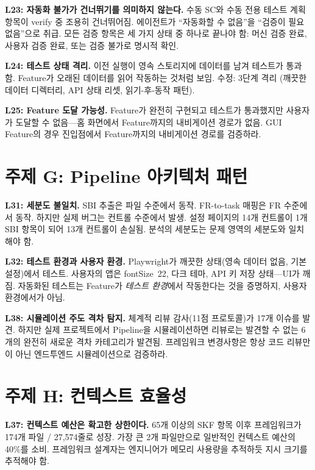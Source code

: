 \documentclass[11pt,a4paper,openright,twoside]{report}
\begin{document}
\textbf{L23: 자동화 불가가 건너뛰기를 의미하지 않는다.} 수동 SC와 수동 전용 테스트 계획 항목이 verify 중 조용히 건너뛰어짐. 에이전트가 ``자동화할 수 없음''을 ``검증이 필요 없음''으로 취급. 모든 검증 항목은 세 가지 상태 중 하나로 끝나야 함: 머신 검증 완료, 사용자 검증 완료, 또는 검증 불가로 명시적 확인.

\textbf{L24: 테스트 상태 격리.} 이전 실행이 영속 스토리지에 데이터를 남겨 테스트가 통과함. Feature가 오래된 데이터를 읽어 작동하는 것처럼 보임. 수정: 3단계 격리 (깨끗한 데이터 디렉터리, API 상태 리셋, 읽기-후-동작 패턴).

\textbf{L25: Feature 도달 가능성.} Feature가 완전히 구현되고 테스트가 통과했지만 사용자가 도달할 수 없음---홈 화면에서 Feature까지의 내비게이션 경로가 없음. GUI Feature의 경우 진입점에서 Feature까지의 내비게이션 경로를 검증하라.

\section{주제 G: Pipeline 아키텍처 패턴}

\textbf{L31: 세분도 불일치.} SBI 추출은 파일 수준에서 동작. FR-to-task 매핑은 FR 수준에서 동작. 하지만 실제 버그는 컨트롤 수준에서 발생. 설정 페이지의 14개 컨트롤이 1개 SBI 항목이 되어 13개 컨트롤이 손실됨. 분석의 세분도는 문제 영역의 세분도와 일치해야 함.

\textbf{L32: 테스트 환경과 사용자 환경.} Playwright가 깨끗한 상태(영속 데이터 없음, 기본 설정)에서 테스트. 사용자의 앱은 fontSize~22, 다크 테마, API 키 저장 상태---UI가 깨짐. 자동화된 테스트는 Feature가 \emph{테스트 환경}에서 작동한다는 것을 증명하지, 사용자 환경에서가 아님.

\textbf{L38: 시뮬레이션 주도 격차 탐지.} 체계적 리뷰 감사(11점 프로토콜)가 17개 이슈를 발견. 하지만 실제 프로젝트에서 Pipeline을 시뮬레이션하면 리뷰로는 발견할 수 없는 6개의 완전히 새로운 격차 카테고리가 발견됨. 프레임워크 변경사항은 항상 코드 리뷰만이 아닌 엔드투엔드 시뮬레이션으로 검증하라.

\section{주제 H: 컨텍스트 효율성}

\textbf{L37: 컨텍스트 예산은 확고한 상한이다.} 65개 이상의 SKF 항목 이후 프레임워크가 174개 파일 / 27,574줄로 성장. 가장 큰 2개 파일만으로 일반적인 컨텍스트 예산의 40\%를 소비. 프레임워크 설계자는 엔지니어가 메모리 사용량을 추적하듯 지시 크기를 추적해야 함.
\end{document}
